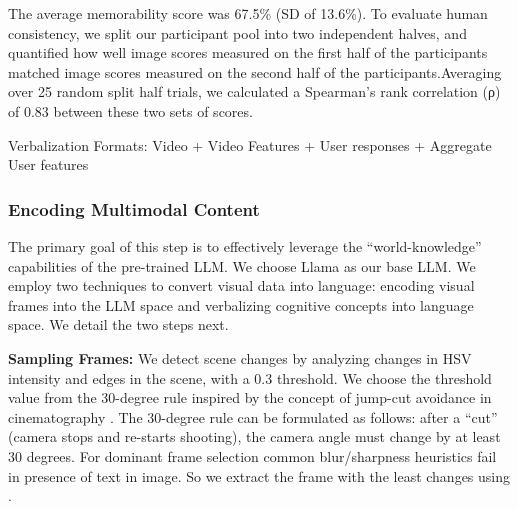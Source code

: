 The average memorability score was 67.5\% (SD of 13.6\%). 
To evaluate human consistency, we split our participant pool into two independent halves, and quantified how well image scores measured on the first half of the participants matched image scores measured on the second half of the participants.Averaging over 25 random split half trials, we calculated a Spearman's rank correlation (ρ) of 0.83 between these two sets of scores. 

Verbalization Formats:
Video + Video Features + User responses + Aggregate User features

\fi






\subsubsection{Encoding Multimodal Content}
\label{sec:Encoding Visual Content}
The primary goal of this step is to effectively leverage the ``world-knowledge'' capabilities of the pre-trained LLM. We choose Llama \cite{touvron2023llama} as our base LLM. We employ two techniques to convert visual data into language: encoding visual frames into the LLM space and verbalizing cognitive concepts into language space. We detail the two steps next.

\textbf{Sampling Frames:} %
We detect scene changes by analyzing changes in HSV intensity and edges in the scene, with a 0.3 threshold. We choose the threshold value from the 30-degree rule inspired by the concept of jump-cut avoidance in cinematography \cite{arev2014automatic,friedman2004knowledge}. The 30-degree rule can be formulated as follows: after a ``cut'' (camera stops and re-starts shooting), the camera angle must change by at least 30 degrees.
For dominant frame selection common blur/sharpness heuristics fail in presence of text in image. So we extract the frame with the least changes using \cite{xu2022gmflow}.



